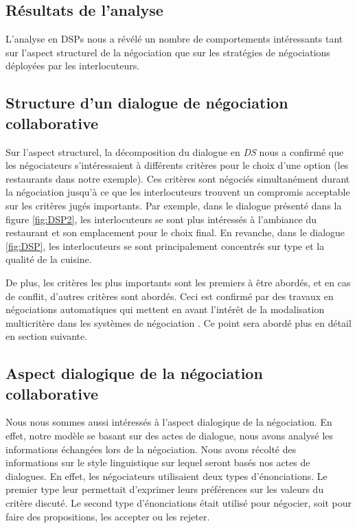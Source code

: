 \subsection{Résultats de l'analyse}

L'analyse en DSPs nous a révélé un nombre de comportements intéressants tant sur l'aspect structurel de la négociation que sur les stratégies de négociations déployées par les interlocuteurs. 

\subsection{Structure d'un dialogue de négociation collaborative}

Sur l'aspect structurel, la décomposition du dialogue en \emph{DS} nous a confirmé que les négociateurs s'intéressaient à différents critères pour le choix d'une option (les restaurants dans notre exemple). Ces critères sont négociés simultanément durant la négociation jusqu'à ce que les interlocuteurs trouvent un compromis acceptable sur les critères jugés importants. 
Par exemple, dans le dialogue présenté dans la figure \ref{fig:DSP2}, les interlocuteurs se sont plus intéressés à l'ambiance du restaurant et son emplacement pour le choix final. En revanche, dans le dialogue \ref{fig:DSP}, les interlocuteurs se sont principalement concentrés sur type et la qualité de la cuisine.

De plus, les critères les plus importants sont les premiers à être abordés, et en cas de conflit, d'autres critères sont abordés. 
Ceci est confirmé par des travaux en négociations automatiques qui mettent en avant l'intérêt de la modalisation multicritère dans les systèmes de négociation \cite{jonker2007agent,lai2004literature}. Ce point sera abordé plus en détail en section suivante. 

\subsection{Aspect dialogique de la négociation collaborative} \label{sec:aspectDial}
Nous nous sommes aussi intéressés à l'aspect dialogique de la négociation. En effet, notre modèle se basant sur des actes de dialogue, nous avons analysé les informations échangées lors de la négociation. 
Nous avons récolté des informations sur le style linguistique sur lequel seront basés nos actes de dialogues. En effet, les négociateurs utilisaient deux types d'énonciations. Le premier type leur permettait d'exprimer leurs préférences sur les valeurs du critère discuté. Le second type d'énonciations était utilisé pour négocier, soit pour faire des propositions, les accepter ou les rejeter. 

